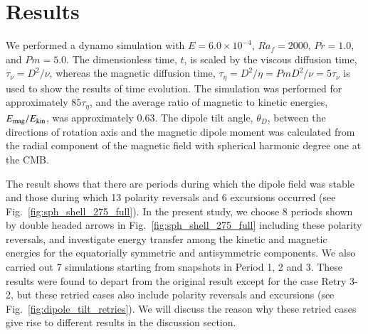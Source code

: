 \section{Results}
\label{section:results}

We performed a dynamo simulation with $E = 6.0 \times 10^{-4}$, $Ra_f = 2000$, $Pr = 1.0$, and $Pm = 5.0$. 
The dimensionless time, $t$, is scaled by the viscous diffusion time, $\tau_\nu = D^2 / \nu$, whereas the magnetic diffusion time, $\tau_\eta = D^2 / \eta = Pm D^2 / \nu = 5 \tau_\nu$ is used to show the results of time evolution. %
The simulation was performed for approximately $85 \tau_\eta$, and the average ratio of magnetic to kinetic energies, $E_{\rm mag} / E_{\rm kin}$, was approximately 0.63. 
The dipole tilt angle, $\theta_D$, between the directions of rotation axis and the magnetic dipole moment was calculated from the radial component of the magnetic field with spherical harmonic degree one  at the CMB.




{\color{red}
The result shows that there are periods during which the dipole field was stable and those during which 13 polarity reversals and 6 excursions occurred (see Fig.~\ref{fig:sph_shell_275_full}).
}
In the present study, we choose 8 periods shown by double headed arrows in Fig.~\ref{fig:sph_shell_275_full} including these polarity reversals, and investigate energy transfer among the kinetic and magnetic energies for the equatorially symmetric and antisymmetric components. 
We also carried out 7 simulations starting from snapshots in Period 1, 2 and 3. 
{\color{red}
These results were found to depart from the original result except for the case Retry 3-2, but these retried cases also include polarity reversals and excursions (see Fig.~\ref{fig:dipole_tilt_retries}). 
We will discuss the reason why these retried cases give rise to different results in the discussion section.
}

